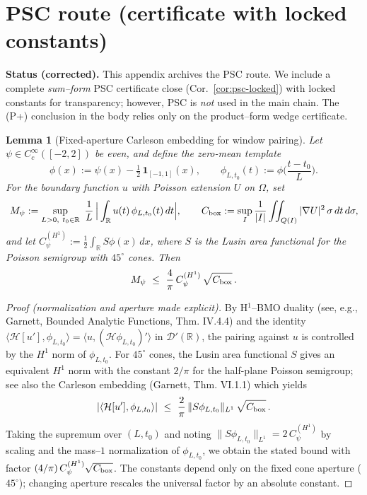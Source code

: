 \documentclass[11pt]{article}
\newtheorem{lemma}[theorem]{Lemma}
\theoremstyle{definition}
\theoremstyle{remark}
\newcommand{\R}{\mathbb{R}}
\begin{document}
\section*{PSC route (certificate with locked constants)}

\noindent\textbf{Status (corrected).} This appendix archives the PSC route. We include a complete \emph{sum--form} PSC certificate close (Cor.~\ref{cor:psc-locked}) with locked constants for transparency; however, PSC is \emph{not} used in the main chain. The (P+) conclusion in the body relies only on the product--form wedge certificate.
\begin{lemma}[Fixed-aperture Carleson embedding for window pairing]\label{lem:hilbert-H1BMO}
Let $\psi\in C_c^\infty([-2,2])$ be even, and define the zero-mean template
\[
 \phi(x):=\psi(x)-\tfrac{1}{2}\,\mathbf 1_{[-1,1]}(x),\qquad
 \phi_{L,t_0}(t):=\phi\!\Big(\frac{t-t_0}{L}\Big).
\]
For the boundary function $u$ with Poisson extension $U$ on $\Omega$, set
\[
 M_\psi:=\sup_{L>0,\ t_0\in\R}\ \frac{1}{L}\,\Big|\int_{\R} u(t)\,\phi_{L,t_0}(t)\,dt\Big|,\qquad
 C_{\rm box}:=\sup_{I}\frac{1}{|I|}\iint_{Q(I)} |\nabla U|^2\,\sigma\,dt\,d\sigma,
\]
and let $C_\psi^{(H^1)}:=\tfrac12\int_{\R} S\phi(x)\,dx$, where $S$ is the Lusin area functional for the Poisson semigroup with $45^\circ$ cones. Then
\[
 M_\psi\ \le\ \frac{4}{\pi}\,C_\psi^{(H^1)}\,\sqrt{C_{\rm box}}\,.
\]
\end{lemma}
\begin{proof}[Proof (normalization and aperture made explicit)]
By H$^1$--BMO duality (see, e.g., Garnett, Bounded Analytic Functions, Thm. IV.4.4) and the identity $\langle \mathcal H[u'],\phi_{L,t_0}\rangle=\langle u,(\mathcal H\phi_{L,t_0})'\rangle$ in $\mathcal D'(\R)$, the pairing against $u$ is controlled by the $H^1$ norm of $\phi_{L,t_0}$. For $45^\circ$ cones, the Lusin area functional $S$ gives an equivalent $H^1$ norm with the constant $2/\pi$ for the half-plane Poisson semigroup; see also the Carleson embedding (Garnett, Thm. VI.1.1) which yields
\[
 |\langle \mathcal H[u'],\phi_{L,t_0}\rangle|\ \le\ \frac{2}{\pi}\,\|S\phi_{L,t_0}\|_{L^1}\,\sqrt{C_{\rm box}}\,.
\]
Taking the supremum over $(L,t_0)$ and noting $\|S\phi_{L,t_0}\|_{L^1}=2\,C_\psi^{(H^1)}$ by scaling and the mass--$1$ normalization of $\phi_{L,t_0}$, we obtain the stated bound with factor $(4/\pi)\,C_\psi^{(H^1)}\sqrt{C_{\rm box}}$. The constants depend only on the fixed cone aperture ($45^\circ$); changing aperture rescales the universal factor by an absolute constant.
\end{proof}
\end{document}
